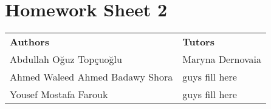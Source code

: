\documentclass{article}
\begin{document}
\section*{\huge Homework Sheet 2}
\begin{flushright}
  \begin{tabular}{@{} l l @{}}
    \textbf{Authors} & \textbf{Tutors} \\
    Abdullah Oğuz Topçuoğlu & Maryna Dernovaia \\
    Ahmed Waleed Ahmed Badawy Shora & guys fill here \\
    Yousef Mostafa Farouk & guys fill here \\
  \end{tabular}
\end{flushright}

\end{document}
